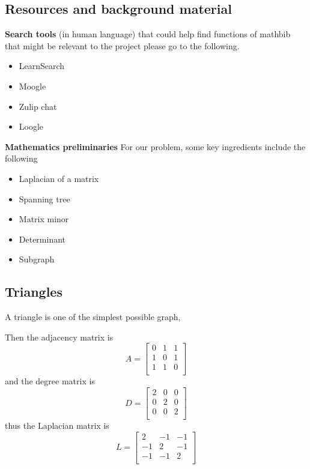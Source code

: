 \documentclass{article}
\theoremstyle{definition}
\begin{document}
\subsection{Resources and background material}



\noindent
\textbf{Search tools} (in human language) that could help  find functions of mathbib that might be relevant to the project please go to the following.
\begin{itemize}
    \item LearnSearch
    \item Moogle
    \item Zulip chat
    \item Loogle
\end{itemize}


\noindent
\textbf{Mathematics preliminaries} For our problem, some key ingredients include the following
\begin{itemize}
    \item Laplacian of a matrix
    \item Spanning tree
    \item Matrix minor
    \item Determinant
    \item Subgraph
    
\end{itemize}

\subsection{Triangles}

A triangle is one of the simplest possible graph, 
\begin{center}
\end{center}
Then the adjacency matrix is
$$
A = \begin{bmatrix}
0 & 1 & 1 \\
1 & 0 & 1 \\
1 & 1 & 0 \\
\end{bmatrix}
$$
and the degree matrix is 
$$
D = \begin{bmatrix}
2 & 0 & 0 \\
0 & 2 & 0 \\
0 & 0 & 2 \\
\end{bmatrix}
$$
thus the Laplacian matrix is
$$
L = \begin{bmatrix}
2 & -1 & -1 \\
-1 & 2 & -1 \\
-1 & -1 & 2 \\
\end{bmatrix}
$$
\end{document}
